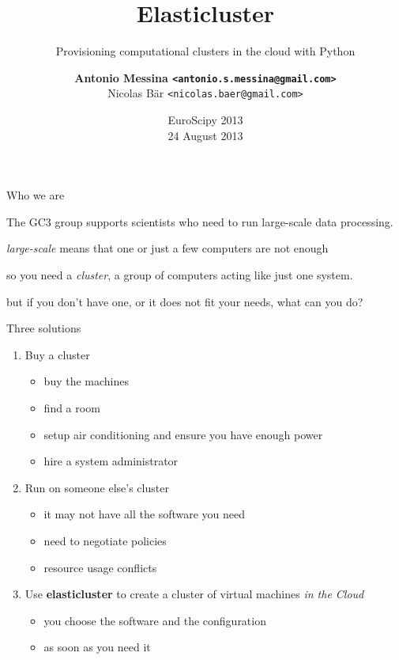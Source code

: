 \documentclass[english,serif,mathserif,usenames,dvipsnames]{beamer}
\begin{document}
\title{Elasticluster}
\subtitle{Provisioning computational clusters in the cloud with Python}
\author{\textbf{Antonio Messina
    \texttt{<antonio.s.messina@gmail.com>}}\\
Nicolas B\"ar \texttt{<nicolas.baer@gmail.com>}}
\date{EuroScipy 2013\\
  24 August 2013}

\maketitle

\begin{frame}{Who we are}
  
  The GC3 group supports scientists who need to run large-scale data
  processing.

  \pause
  \+

  \textit{large-scale} means that one or just a few computers are not
  enough

  \pause
  \+

  so you need a \textit{cluster}, a group of computers acting like
  just one system.

  \pause
  \+
  but if you don't have one, or it does not fit your needs, what can
  you do?
\end{frame}

\begin{frame}
  {Three solutions}
  \begin{enumerate}
  \item Buy a cluster
    \begin{itemize}
    \item buy the machines
    \item find a room
    \item setup air conditioning and ensure you have enough power
    \item hire a system administrator
    \end{itemize}
    \+
    \pause
  \item Run on someone else's cluster
    \begin{itemize}
    \item it may not have all the software you need
    \item need to negotiate policies
    \item resource usage conflicts
    \end{itemize}
    \+
    \pause
  \item Use \textbf{elasticluster} to create a cluster of virtual
    machines \textit{in the Cloud}
    \begin{itemize}
    \item you choose the software and the configuration
    \item as soon as you need it
    \end{itemize}
  \end{enumerate}
\end{frame}
\end{document}
